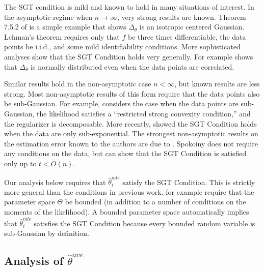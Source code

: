 \documentclass[twoside]{article}
\newcommand{\w}{\theta}
\newcommand{\wave}{\hat\w^{ave}}
\newcommand{\wmle}{\hat\w^{mle}}
\begin{document}

The SGT condition is mild and known to hold in many situations of interest.
In the asymptotic regime when $n\to\infty$,
very strong results are known.
Theorem 7.5.2 of \cite{lehmann1999elements} is a simple example that shows $\Delta_\theta$ is an isotropic centered Gaussian.
Lehman's theorem requires only that $f$ be three times differentiable,
the data points be i.i.d.,
and some mild identifiability conditions.
More sophisticated analyses show that the SGT Condition holds very generally.
For example \cite{spokoiny2012parametricestimation} shows that $\Delta_\w$ is normally distributed even when the data points are correlated.

Similar results hold in the non-asymptotic case $n<\infty$,
but known results are less strong.
Most non-asymptotic results of this form require that the data points also be sub-Gaussian.
For example, \cite{negahban2009unified} considers the case when the data points are sub-Gaussian, the likelihood satisfies a ``restricted strong convexity condition,'' and the regularizer is decomposable.
More recently, \cite{sivakumar2015beyond} showed the SGT Condition holds when the data are only sub-exponential.
The strongest non-asymptotic results on the estimation error known to the authors are due to \cite{spokoiny2012parametricestimation}.
Spokoiny does not require any conditions on the data,
but can show that the SGT Condition is satisfied only up to $t < O(n)$.

Our analysis below requires that $\wmle_i$ satisfy the SGT Condition.
This is strictly more general than the conditions in previous work.
\cite{zhang2012communication} for example require that the parameter space $\Theta$ be bounded (in addition to a number of conditions on the moments of the likelihood).
A bounded parameter space automatically implies that $\wmle_i$ satisfies the SGT Condition because every bounded random variable is sub-Gaussian by definition.


\subsection{Analysis of $\wave$}
\end{document}
